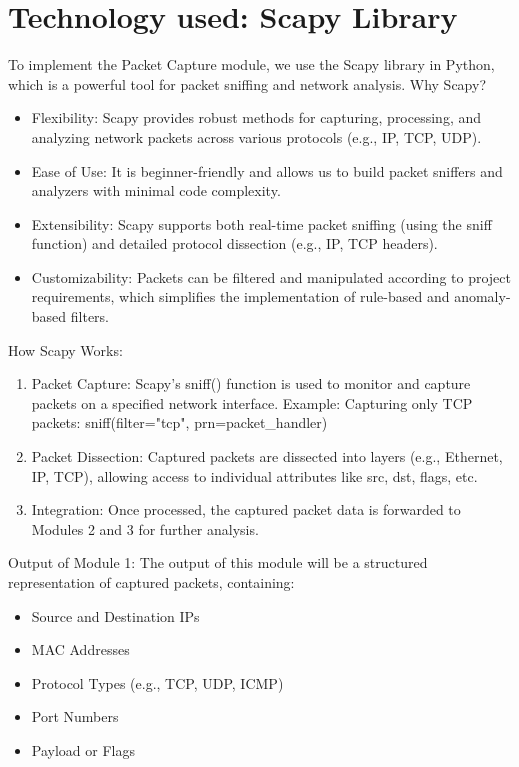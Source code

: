 \documentclass[oneside, english]{reports/assets/sdqtechreport}
\begin{document}
\section{Technology used: Scapy Library}
\label{sec:ScapyLibrary}

To implement the Packet Capture module, we use the Scapy library in Python,
which is a powerful tool for packet sniffing and network analysis. Why Scapy?

\begin{itemize}
	\item Flexibility: Scapy provides robust methods for capturing, processing, and
	      analyzing network packets across various protocols (e.g., IP, TCP, UDP).
	\item Ease of Use: It is beginner-friendly and allows us to build packet sniffers and
	      analyzers with minimal code complexity.
	\item Extensibility: Scapy supports both real-time packet sniffing (using the sniff
	      function) and detailed protocol dissection (e.g., IP, TCP headers).
	\item Customizability: Packets can be filtered and manipulated according to project
	      requirements, which simplifies the implementation of rule-based and
	      anomaly-based filters.
\end{itemize}

How Scapy Works:

\begin{enumerate}
	\item Packet Capture: Scapy's sniff() function is used to monitor and capture packets
	      on a specified network interface. Example: Capturing only TCP packets:
	      sniff(filter="tcp", prn=packet\_handler)
	\item Packet Dissection: Captured packets are dissected into layers (e.g., Ethernet,
	      IP, TCP), allowing access to individual attributes like src, dst, flags, etc.
	\item Integration: Once processed, the captured packet data is forwarded to Modules 2
	      and 3 for further analysis.
\end{enumerate}

Output of Module 1: The output of this module will be a structured
representation of captured packets, containing:

\begin{itemize}
	\item Source and Destination IPs
	\item MAC Addresses
	\item Protocol Types (e.g., TCP, UDP, ICMP)
	\item Port Numbers
	\item Payload or Flags
\end{itemize}
\end{document}

